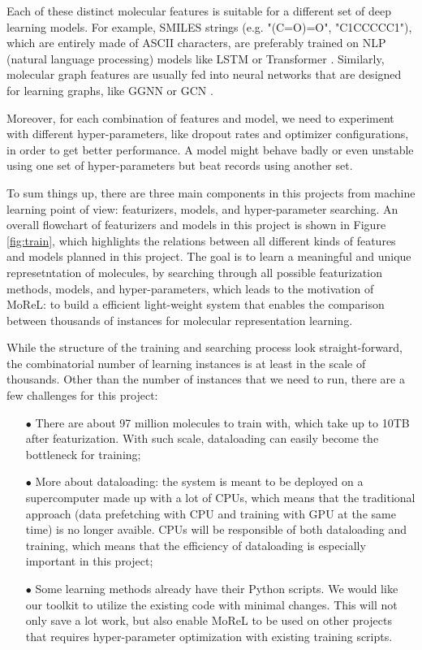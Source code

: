 \documentclass[conference]{IEEEtran}
\begin{document}
Each of these distinct molecular features is suitable for a different set of deep learning models. 
For example, SMILES strings (e.g. "(C=O)=O", "C1CCCCC1"), which are entirely made of ASCII characters, are preferably trained on NLP (natural language processing) models like LSTM \cite{lstm} or Transformer \cite{transformer}. 
Similarly, molecular graph features are usually fed into neural networks that are designed for learning graphs, like GGNN \cite{ggnn} or GCN \cite{gcn}. 

Moreover, for each combination of features and model, we need to experiment with different hyper-parameters, like dropout rates and optimizer configurations, in order to get better performance. 
A model might behave badly or even unstable using one set of hyper-parameters but beat records using another set. 

To sum things up, there are three main components in this projects from machine learning point of view: featurizers, models, and hyper-parameter searching. 
An overall flowchart of featurizers and models in this project is shown in Figure \ref{fig:train}, which highlights the relations between all different kinds of features and models planned in this project. 
The goal is to learn a meaningful and unique represetntation of molecules, by searching through all possible featurization methods, models, and hyper-parameters, which leads to the motivation of MoReL: to build a efficient light-weight system that enables the comparison between thousands of instances for molecular representation learning.

While the structure of the training and searching process look straight-forward, the combinatorial number of learning instances is at least in the scale of thousands. 
Other than the number of instances that we need to run, there are a few challenges for this project:
\begin{itemize}
	\item[$\bullet$]  There are about 97 million molecules to train with, which take up to 10TB after featurization. With such scale, dataloading can easily become the bottleneck for training;
	\item[$\bullet$]  More about dataloading: the system is meant to be deployed on a supercomputer made up with a lot of CPUs, which means that the traditional approach (data prefetching with CPU and training with GPU at the same time) is no longer avaible. CPUs will be responsible of both dataloading and training, which means that the efficiency of dataloading is especially important in this project;
	\item[$\bullet$]  Some learning methods already have their Python scripts. We would like our toolkit to utilize the existing code with minimal changes. This will not only save a lot work, but also enable MoReL to be used on other projects that requires hyper-parameter optimization with existing training scripts. 
\end{itemize}
\end{document}
